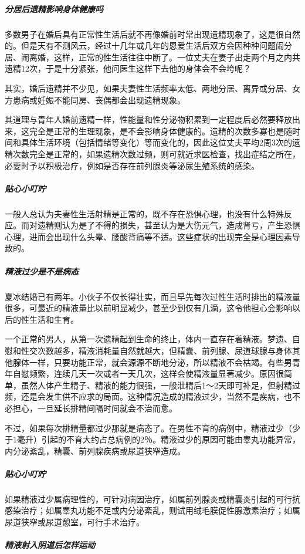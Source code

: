 \subparagraph{分居后遗精影响身体健康吗}

多数男子在婚后具有正常性生活后就不再像婚前时常出现遗精现象了，这是很自然的。但是天有不测风云，经过十几年或几年的恩爱生活后双方会因种种问题闹分居、闹离婚，这样，正常的性生活往往中断了。一位丈夫在妻子出走两个月之内共遗精12次，于是十分紧张，他问医生这样下去他的身体会不会垮呢？

其实，婚后遗精并不少见，如果夫妻性生活频率太低、两地分居、离异或分居、女方患病或妊娠不能同房、丧偶都会出现遗精现象。

其道理与青年人婚前遗精一样，性能量和性分泌物积累到一定程度后必然要释放出来，这完全是正常的生理现象，是不会影响身体健康的。遗精的次数多寡也是随时间和具体生活环境（包括情绪等变化）等而变化的，因此这位丈夫平均2周3次的遗精次数完全是正常的，如果遗精次数过频，则可就近求医检查，找出症结之所在，必要时予以积极治疗，例如是否存在前列腺炎等泌尿生殖系统的感染。

\subparagraph{贴心小叮咛}

一般人总认为夫妻性生活射精是正常的，既不存在恐惧心理，也没有什么特殊反应。而对遗精则认为是了不得的损失，甚至认为是大伤元气，造成肾亏，产生恐惧心理，进而会出现什么头晕、腰酸背痛等不适。这些症状的出现完全是心理因素导致的。

\subparagraph{精液过少是不是病态}

夏冰结婚已有两年。小伙子不仅长得壮实，而且早先每次过性生活时排出的精液量很多，可最近的精液量比以前明显减少，甚至少到仅有几滴，这令他担心会影响以后的性生活和生育。

一个正常的男人，从第一次遗精起到生命的终止，体内一直存在着精液。梦遗、自慰和性交次数越多，精液消耗量自然就越大，但精囊、前列腺、尿道球腺与身体其他腺体一样，只要功能正常，就会源源不断地分泌，所以精液不会枯竭。有些男青年自慰频繁，连续几天一次或者一天几次，这样会使精液量显著减少。原因很简单，虽然人体产生精子、精液的能力很强，一般泄精后1～2天即可补足，但射精过频，还是会发生供不应求的局面。这种情况造成的精液过少，当然不是疾病，也不必担心，一旦延长排精间隔时间就会不治而愈。

不过，如果每次排精量都过少那就是病态了。在男性不育的病例中，精液过少（少于1毫升）引起的不育大约占总病例的2％。精液过少的原因可能由睾丸功能异常，内分泌紊乱，精囊、前列腺疾病或尿道狭窄造成。

\subparagraph{贴心小叮咛}

如果精液过少属病理性的，可针对病因治疗，如属前列腺炎或精囊炎引起的可行抗感染治疗；如属睾丸功能不足或内分泌紊乱，则试用绒毛膜促性腺激素治疗；如属尿道狭窄或尿道憩室，可行手术治疗。

\subparagraph{精液射入阴道后怎样运动}

